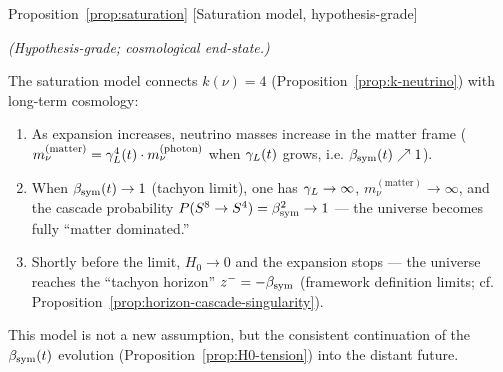 \begin{qsarchived}{Proposition~\ref{prop:saturation} [Saturation model, hypothesis-grade]}
\begin{proposition}

\emph{(Hypothesis-grade; cosmological end-state.)}

The saturation model connects $k(\nu)=4$
(Proposition~\ref{prop:k-neutrino}) with long-term cosmology:
\begin{enumerate}[label=(\arabic*)]
 \item As expansion increases, neutrino masses increase in the matter frame
 ($m_\nu^{(\mathrm{matter})} = \gamma_L^4(t)\cdot m_\nu^{(\mathrm{photon})}$
 when $\gamma_L(t)$ grows, i.e. $\beta_{\mathrm{sym}}(t)\nearrow 1$).
 \item When $\beta_{\mathrm{sym}}(t)\to 1$ (tachyon limit), one has
 $\gamma_L\to\infty$, $m_\nu^{(\mathrm{matter})}\to\infty$, and the cascade
 probability $P(S^8\to S^4) = \beta_{\mathrm{sym}}^2\to 1$ --- the universe becomes
 fully ``matter dominated.''
 \item Shortly before the limit, $H_0\to 0$ and the expansion stops ---
 the universe reaches the ``tachyon horizon'' $z^- = -\beta_{\mathrm{sym}}$
 (framework definition limits; cf.
 Proposition~\ref{prop:horizon-cascade-singularity}).
\end{enumerate}
This model is not a new assumption, but the consistent continuation of
the $\beta_{\mathrm{sym}}(t)$ evolution (Proposition~\ref{prop:H0-tension}) into the
distant future.
\end{proposition}
\end{qsarchived}

